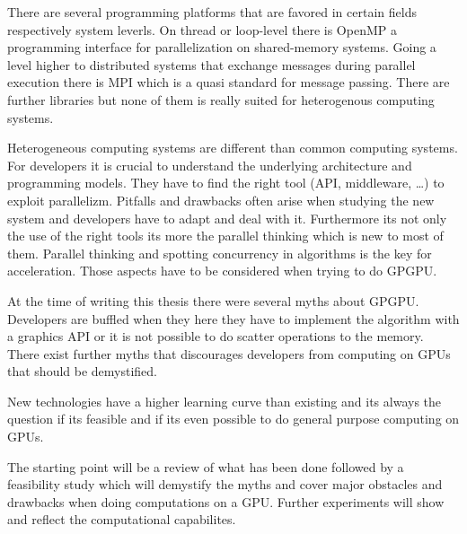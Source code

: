 
There are several programming platforms that are favored in certain fields 
respectively system leverls. On thread or loop-level there is OpenMP a programming
interface for parallelization on shared-memory systems. Going a level higher to
distributed systems that exchange messages during parallel execution there is 
\gls{MPI} which is a quasi standard for message passing. There are further 
libraries but none of them is really suited for heterogenous computing systems.

Heterogeneous computing systems are different than common computing systems. For
developers it is crucial to understand the underlying architecture and
programming models. They have to find the right tool (\gls{API}, middleware,
\ldots) to exploit parallelizm. Pitfalls and drawbacks often arise when studying
the new system and developers have to adapt and deal with it. Furthermore its
not only the use of the right tools its more the parallel thinking which is new
to most of them. Parallel thinking and spotting concurrency in algorithms is the
key for acceleration. Those aspects have to be considered when trying to do
\gls{GPGPU}.


At the time of writing this thesis there were several myths about \gls{GPGPU}.
Developers are buffled when they here they have to implement the algorithm with
a graphics \gls{API} or it is not possible to do scatter operations to the memory.
There exist further myths that discourages developers from computing on
\glspl{GPU} that should be demystified. 

New technologies have a higher learning curve than existing and its always the 
question if its feasible and if its even possible to do general purpose computing
on \glspl{GPU}. 


The starting point will be a review of what has been done followed by a
feasibility study which will demystify the myths and cover major obstacles and
drawbacks when doing computations on a \gls{GPU}. Further experiments will show
and reflect the computational capabilites.





